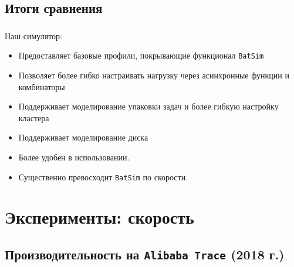\documentclass[t]{beamer}  %
\begin{document}
\subsection{Итоги сравнения}

\begin{frame}[fragile]
	\frametitle{\insertsection} 
	\framesubtitle{\insertsubsection}
	Наш симулятор:
\begin{itemize}
	\item<1->Предоставляет базовые профили, покрывающие функционал \texttt{BatSim}
	\item<2-> Позволяет более гибко настраивать нагрузку через асинхронные функции и комбинаторы 
	\item<3-> Поддерживает моделирование упаковки задач и более гибкую настройку кластера
	\item<4-> Поддерживает моделирование диска 
	\item<5-> Более удобен в использовании.
	\item<6-> Существенно превосходит \texttt{BatSim} по скорости.
\end{itemize}
\end{frame}






\section{Эксперименты: скорость}
\subsection{Производительность на \texttt{Alibaba Trace} (2018 г.)}
\end{document}
